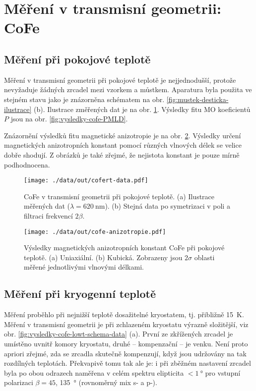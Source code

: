 \section{Měření v transmisní geometrii: CoFe}
\label{chap:vysledky-cofe}

\subsection{Měření při pokojové teplotě}
\label{chap:vysledky-cofe-roomt}

Měření v transmisní geometrii při pokojové teplotě je nejjednodušší, protože nevyžaduje žádných zrcadel mezi vzorkem a můstkem.
Aparatura byla použita ve stejném stavu jako je znázorněna schématem na obr. \ref{fig:mustek-desticka-ilustrace} (b).
Ilustrace změřených dat je na obr. \ref{fig:vysledky-cofe-schema-data}.
Výsledky fitu MO koeficientů $P$ jsou na obr. \ref{fig:vysledky-cofe-PMLD}.

Znázornění výsledků fitu magnetické anizotropie je na obr. \ref{fig:vysledky-cofe-roomt-anizotropie}.
Výsledky určení magnetických anizotropních konstant pomocí různých vlnových délek se velice dobře shodují. 
Z obrázků je také zřejmé, že nejistota konstant je pouze mírně podhodnocena.

\begin{figure}[htbp]
    \centering
    \texttt{[image: ./data/out/cofert-data.pdf]}
    \caption{CoFe v transmisní geometrii při pokojové teplotě. (a) Ilustrace měřených dat ($\lambda=\SI{620}{\nano\meter}$). (b) Stejná data po symetrizaci v poli a filtraci frekvencí $2\beta$.}
    \label{fig:vysledky-cofe-schema-data}
\end{figure}

\begin{figure}[htbp]
    \centering
    \texttt{[image: ./data/out/cofe-anizotropie.pdf]}
    \caption{Výsledky magnetických anizotropních konstant CoFe při pokojové teplotě. (a) Uniaxiální. (b) Kubická. Zobrazeny jsou $2\sigma$ oblasti měřené jednotlivými vlnovými délkami.}
    \label{fig:vysledky-cofe-roomt-anizotropie}
\end{figure}


\subsection{Měření při kryogenní teplotě}
\label{chap:vysledky-cofe-lowt}

Měření proběhlo při nejnižší teplotě dosažitelné kryostatem, tj. přibližně \SI{15}{\kelvin}.
Měření v transmisní geometrii je při zchlazeném kryostatu výrazně složitější, viz obr. \ref{fig:vysledky-cofe-lowt-schema-data} (a).
První ze zkřížených zrcadel je umístěno uvnitř komory kryostatu, druhé -- kompenzační -- je venku.
Není proto apriori zřejmé, zda se zrcadla skutečně kompenzují, když jsou udržovány na tak rozdílných teplotách.
Překvapivě tomu tak ale je: i při zběžném nastavení zrcadel byla po obou odrazech naměřena v celém spektru elipticita $<\SI{1}{\degree}$ pro vstupní polarizaci $\beta=45$, \SI{135}{\degree} (rovnoměrný mix s- a p-).

